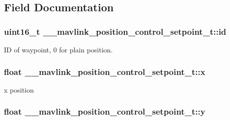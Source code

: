 \subsection{Field Documentation}
\hypertarget{struct____mavlink__position__control__setpoint__t_ae1c4982fa549c010060a1de4cbb534a7}{
\subsubsection[{id}]{\setlength{\rightskip}{0pt plus 5cm}uint16\+\_\+t \+\_\+\+\_\+mavlink\+\_\+position\+\_\+control\+\_\+setpoint\+\_\+t\+::id}}\label{struct____mavlink__position__control__setpoint__t_ae1c4982fa549c010060a1de4cbb534a7}


I\+D of waypoint, 0 for plain position. 

\hypertarget{struct____mavlink__position__control__setpoint__t_af474c7cae445b05fa8e4fe96a79ba880}{
\subsubsection[{x}]{\setlength{\rightskip}{0pt plus 5cm}float \+\_\+\+\_\+mavlink\+\_\+position\+\_\+control\+\_\+setpoint\+\_\+t\+::x}}\label{struct____mavlink__position__control__setpoint__t_af474c7cae445b05fa8e4fe96a79ba880}


x position 

\hypertarget{struct____mavlink__position__control__setpoint__t_aadce2a9a984dbaadd51556ba85bbbdb2}{
\subsubsection[{y}]{\setlength{\rightskip}{0pt plus 5cm}float \+\_\+\+\_\+mavlink\+\_\+position\+\_\+control\+\_\+setpoint\+\_\+t\+::y}}\label{struct____mavlink__position__control__setpoint__t_aadce2a9a984dbaadd51556ba85bbbdb2}


